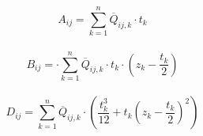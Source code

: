 \begin{equation}
	A_{ij}= \sum_{k=1}^{n} \overline{Q}_{ij,k}\cdot t_{k}
\end{equation}\\

\begin{equation}
	B_{ij}= \cdot \sum_{k=1}^{n} \overline{Q}_{ij,k}\cdot t_{k}\cdot \left(z_{k}-\frac{t_{k}}{2}\right)
\end{equation}\\

\begin{equation}
	D_{ij}=\sum_{k=1}^{n} \overline{Q}_{ij,k}\cdot \left(\frac{t_{k}^{3}}{12}+t_{k}\left(z_{k}-\frac{t_{k}}{2}\right)^{2}\right)
\end{equation}

